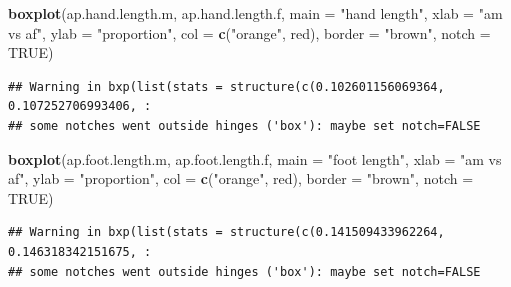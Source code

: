 \documentclass[]{article}
\newenvironment{Shaded}{\begin{snugshade}}{\end{snugshade}}
\newcommand{\DataTypeTok}[1]{\textcolor[rgb]{0.13,0.29,0.53}{#1}}
\newcommand{\KeywordTok}[1]{\textcolor[rgb]{0.13,0.29,0.53}{\textbf{#1}}}
\newcommand{\NormalTok}[1]{#1}
\newcommand{\OtherTok}[1]{\textcolor[rgb]{0.56,0.35,0.01}{#1}}
\newcommand{\StringTok}[1]{\textcolor[rgb]{0.31,0.60,0.02}{#1}}
\begin{document}
\begin{Shaded}
\begin{Highlighting}[]
\KeywordTok{boxplot}\NormalTok{(ap.hand.length.m, ap.hand.length.f,}
        \DataTypeTok{main =} \StringTok{"hand length"}\NormalTok{,}
        \DataTypeTok{xlab =} \StringTok{"am vs af"}\NormalTok{,}
        \DataTypeTok{ylab =} \StringTok{"proportion"}\NormalTok{,}
        \DataTypeTok{col =} \KeywordTok{c}\NormalTok{(}\StringTok{"orange"}\NormalTok{, }\StringTok{\textquotesingle{}red\textquotesingle{}}\NormalTok{),}
        \DataTypeTok{border =} \StringTok{"brown"}\NormalTok{,}
        \DataTypeTok{notch =} \OtherTok{TRUE}\NormalTok{)}
\end{Highlighting}
\end{Shaded}

\begin{verbatim}
## Warning in bxp(list(stats = structure(c(0.102601156069364, 0.107252706993406, :
## some notches went outside hinges ('box'): maybe set notch=FALSE
\end{verbatim}

\begin{Shaded}
\begin{Highlighting}[]
\KeywordTok{boxplot}\NormalTok{(ap.foot.length.m, ap.foot.length.f,}
        \DataTypeTok{main =} \StringTok{"foot length"}\NormalTok{,}
        \DataTypeTok{xlab =} \StringTok{"am vs af"}\NormalTok{,}
        \DataTypeTok{ylab =} \StringTok{"proportion"}\NormalTok{,}
        \DataTypeTok{col =} \KeywordTok{c}\NormalTok{(}\StringTok{"orange"}\NormalTok{, }\StringTok{\textquotesingle{}red\textquotesingle{}}\NormalTok{),}
        \DataTypeTok{border =} \StringTok{"brown"}\NormalTok{,}
        \DataTypeTok{notch =} \OtherTok{TRUE}\NormalTok{)}
\end{Highlighting}
\end{Shaded}

\begin{verbatim}
## Warning in bxp(list(stats = structure(c(0.141509433962264, 0.146318342151675, :
## some notches went outside hinges ('box'): maybe set notch=FALSE
\end{verbatim}
\end{document}
